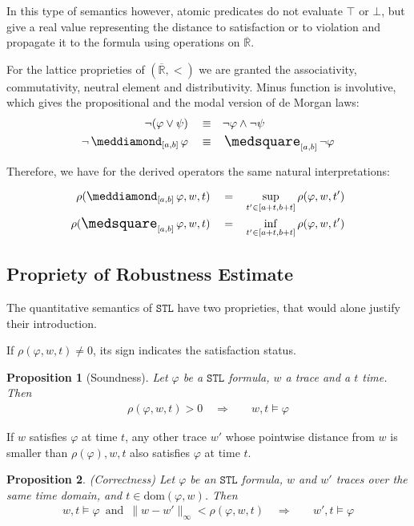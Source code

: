 \documentclass{suftesi}
\newtheorem*{proposition}{Proposition}
\newcommand{\STL}{$\mathtt{STL}$ }
\newcommand{\dom}[1]{\mathrm{dom}(#1 ,w)}
\begin{document}
In this type of semantics however, atomic predicates do not evaluate $\top$ or $\bot$, but give a real value representing the distance to satisfaction or to violation and propagate it to the formula using operations on $\overline{\mathbb{R}}$.

For the lattice proprieties of $(\overline{\mathbb{R}},<)$ we are granted the associativity, commutativity, neutral element and distributivity. Minus function is involutive, which gives the propositional and the modal version of de Morgan laws:
\begin{align*}
    \lnot(\varphi\lor\psi) \quad\equiv  &\quad \lnot\varphi\land\lnot\psi\\
    \lnot\pos_{[a,b]}\varphi \quad\equiv  &\quad \nec_{[a,b]}\lnot\varphi
\end{align*}

Therefore, we have for the derived operators the same natural interpretations:

\begin{align*}
    \rho(\pos_{[a,b]}\varphi,w,t) \quad =   &\quad\sup_{t'\in[a+t,b+t]}\rho(\varphi,w,t')\\
    \rho(\nec_{[a,b]}\varphi,w,t) \quad =   &\quad\inf_{t'\in[a+t,b+t]}\rho(\varphi,w,t')
\end{align*}

\subsection{Propriety of Robustness Estimate}

The quantitative semantics of \STL have two proprieties, that would alone justify their introduction. 

If $\rho(\varphi,w,t)\neq0$, its sign indicates the satisfaction status.

\begin{proposition}[Soundness]
    Let $\varphi$ be a \STL formula, $w$ a trace and a $t$ time. Then 
    \begin{align*}
        \rho(\varphi,w,t)>0\quad   \Rightarrow  &\quad w,t\vDash\varphi
    \end{align*}
\end{proposition}

If $w$ satisfies $\varphi$ at time $t$, any other trace $w'$  whose pointwise distance from $w$ is smaller than $\rho(\varphi),w,t$ also satisfies $\varphi$ at time $t$.

\begin{proposition}(Correctness)
    Let $\varphi$ be an \STL formula, $w$ and $w'$ traces over the same time domain, and $t\in\dom{\varphi}$. Then
    \begin{align*}
        w,t\vDash\varphi \,\text{ and }\, \|w-w'\|_\infty<\rho(\varphi,w,t)\quad    \Rightarrow &\quad w',t\vDash\varphi     
    \end{align*}           
\end{proposition}
\end{document}

